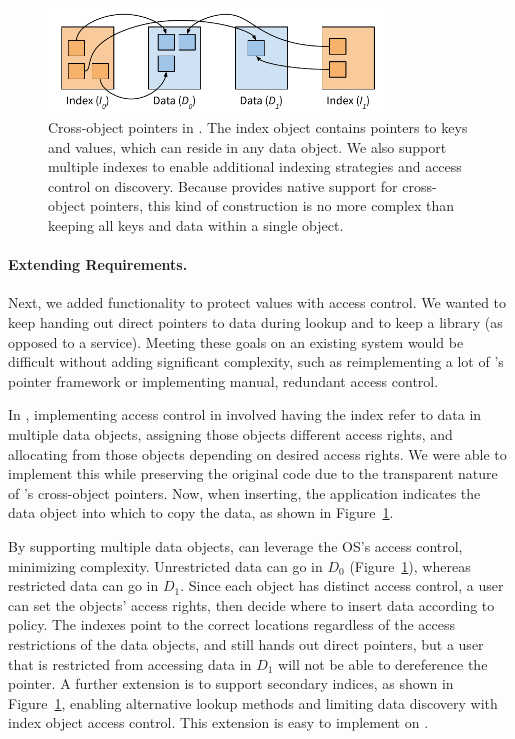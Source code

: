 {    \begin{figure}
        \centering
        \includegraphics[width=3.5in]{fig/twzkv}
        \caption{Cross-object pointers in \nvkv. The index object contains pointers to keys and values,
            which can reside in any data object. We also support multiple indexes to enable additional
            indexing strategies and access control on discovery. Because \Twizzler provides native support
            for cross-object pointers, this kind of construction is no more complex than keeping all keys
            and data within a single object.}
        \label{fig:twzkv}
    \end{figure}




    \paragraph{Extending Requirements.}

    Next, we added functionality to protect values with access control. We wanted to
    keep handing out direct pointers to data during lookup and to
    keep \nvkv a library (as opposed to a service). Meeting these goals on an
    existing system would be difficult without adding significant
    complexity, such as reimplementing a lot of \Twizzler's pointer framework or implementing manual,
    redundant access control.

    In \Twizzler, implementing access control in \nvkv involved having the index refer to data in
    multiple data objects, assigning those objects different access rights, and allocating from
    those objects depending on desired access rights. We were
    able to implement this while preserving the original code due to the
    transparent nature of \Twizzler's cross-object pointers. Now, when inserting, the application
    indicates the data object into which to copy the data, as shown in Figure~\ref{fig:twzkv}.

    By supporting multiple data objects, \nvkv can leverage the OS's access control,
    minimizing complexity. Unrestricted data can go in $D_0$ (Figure~\ref{fig:twzkv}),
    whereas restricted data can go in $D_1$. Since each object has distinct
    access control, a user can set the objects' access rights, then decide
    where to insert data according to policy. The indexes point to the
    correct locations regardless of the access restrictions of the data objects, and \nvkv still hands
    out direct pointers, but a user that is restricted from accessing data in $D_1$ will not
    be able to dereference the pointer. A further extension is to support secondary indices, as shown in
    Figure~\ref{fig:twzkv}, enabling alternative lookup methods and limiting data discovery
    with index object access control. This extension is easy to implement on \Twizzler.

}
